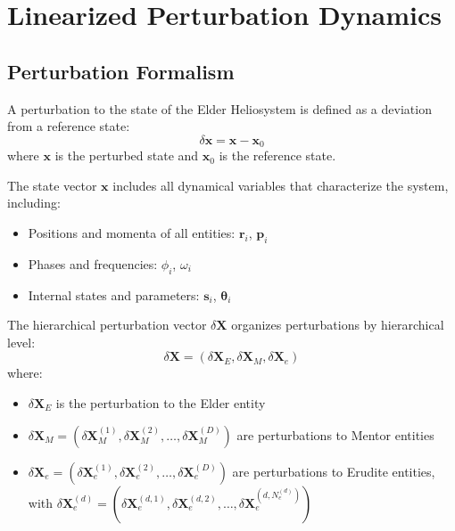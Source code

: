 \section{Linearized Perturbation Dynamics}

\subsection{Perturbation Formalism}

\begin{definition}
A perturbation to the state of the Elder Heliosystem is defined as a deviation from a reference state:
\begin{equation}
\delta\mathbf{x} = \mathbf{x} - \mathbf{x}_0
\end{equation}
where $\mathbf{x}$ is the perturbed state and $\mathbf{x}_0$ is the reference state.
\end{definition}

The state vector $\mathbf{x}$ includes all dynamical variables that characterize the system, including:
\begin{itemize}
    \item Positions and momenta of all entities: $\mathbf{r}_i$, $\mathbf{p}_i$
    \item Phases and frequencies: $\phi_i$, $\omega_i$
    \item Internal states and parameters: $\mathbf{s}_i$, $\boldsymbol{\theta}_i$
\end{itemize}

\begin{definition}
The hierarchical perturbation vector $\delta\mathbf{X}$ organizes perturbations by hierarchical level:
\begin{equation}
\delta\mathbf{X} = (\delta\mathbf{X}_E, \delta\mathbf{X}_M, \delta\mathbf{X}_e)
\end{equation}
where:
\begin{itemize}
    \item $\delta\mathbf{X}_E$ is the perturbation to the Elder entity
    \item $\delta\mathbf{X}_M = (\delta\mathbf{X}_M^{(1)}, \delta\mathbf{X}_M^{(2)}, \ldots, \delta\mathbf{X}_M^{(D)})$ are perturbations to Mentor entities
    \item $\delta\mathbf{X}_e = (\delta\mathbf{X}_e^{(1)}, \delta\mathbf{X}_e^{(2)}, \ldots, \delta\mathbf{X}_e^{(D)})$ are perturbations to Erudite entities, with $\delta\mathbf{X}_e^{(d)} = (\delta\mathbf{X}_e^{(d,1)}, \delta\mathbf{X}_e^{(d,2)}, \ldots, \delta\mathbf{X}_e^{(d,N_e^{(d)})})$
\end{itemize}
\end{definition}

